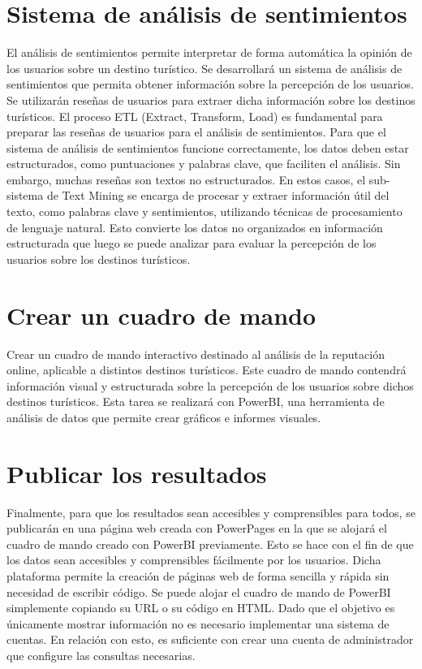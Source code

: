 \section {Sistema de análisis de sentimientos}
El análisis de sentimientos permite interpretar de forma automática la opinión de los usuarios sobre un destino turístico.
Se desarrollará un sistema de análisis de sentimientos que permita obtener información sobre la percepción de los usuarios.
Se utilizarán reseñas de usuarios para extraer dicha información sobre los destinos turísticos.
El proceso ETL (Extract, Transform, Load) es fundamental para preparar las reseñas de usuarios para el análisis de sentimientos.
Para que el sistema de análisis de sentimientos funcione correctamente, los datos deben estar estructurados, como puntuaciones y palabras clave, que faciliten el análisis. 
Sin embargo, muchas reseñas son textos no estructurados. 
En estos casos, el sub-sistema de Text Mining se encarga de procesar y extraer información útil del texto, como palabras clave y sentimientos, utilizando técnicas de procesamiento de lenguaje natural. 
Esto convierte los datos no organizados en información estructurada que luego se puede analizar para evaluar la percepción de los usuarios sobre los destinos turísticos.

\section {Crear un cuadro de mando}
Crear un cuadro de mando interactivo destinado al análisis de la reputación online, aplicable a distintos destinos turísticos.
Este cuadro de mando contendrá información visual y estructurada sobre la percepción de los usuarios sobre dichos destinos turísticos.
Esta tarea se realizará con PowerBI, una herramienta de análisis de datos que permite crear gráficos e informes visuales.

\section {Publicar los resultados}
Finalmente, para que los resultados sean accesibles y comprensibles para todos, se publicarán en una página web creada con PowerPages en la que se alojará el cuadro de mando creado con PowerBI previamente. 
Esto se hace con el fin de que los datos sean accesibles y comprensibles fácilmente por los usuarios.
Dicha plataforma permite la creación de páginas web de forma sencilla y rápida sin necesidad de escribir código. 
Se puede alojar el cuadro de mando de PowerBI simplemente copiando su URL o su código en HTML.
Dado que el objetivo es únicamente mostrar información no es necesario implementar una sistema de cuentas.
En relación con esto, es suficiente con crear una cuenta de administrador que configure las consultas necesarias.